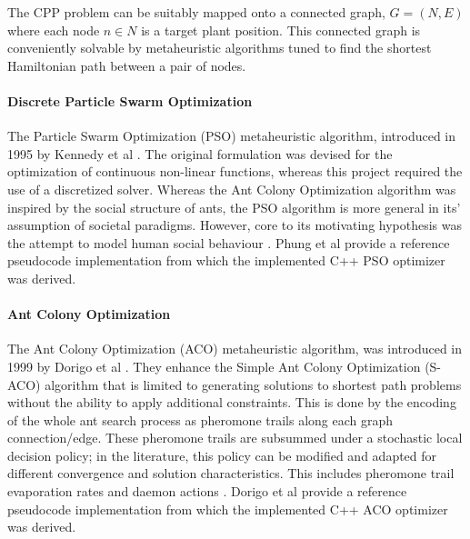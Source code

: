 \documentclass{report}
\begin{document}
The CPP problem can be suitably mapped onto a connected graph, \textit{$G = (N, E)$} where each node \textit{$n \in N$} is a target plant position. This connected graph is conveniently solvable by metaheuristic algorithms tuned to find the shortest Hamiltonian path between a pair of nodes.

\paragraph{Discrete Particle Swarm Optimization}
The Particle Swarm Optimization (PSO) metaheuristic algorithm, introduced in 1995 by Kennedy et al \cite{Kennedy1995}. The original formulation was devised for the optimization of continuous non-linear functions, whereas this project required the use of a discretized solver. Whereas the Ant Colony Optimization algorithm was inspired by the social structure of ants, the PSO algorithm is more general in its' assumption of societal paradigms. However, core to its motivating hypothesis was the attempt to model human social behaviour \cite{Kennedy1995}. Phung et al \cite{Phung2017} provide a reference pseudocode implementation from which the implemented C++ PSO optimizer was derived.

\paragraph{Ant Colony Optimization}
The Ant Colony Optimization (ACO) metaheuristic algorithm, was introduced in 1999 by Dorigo et al \cite{Dorigo1999}. They enhance the Simple Ant Colony Optimization (S-ACO) algorithm that is limited to generating solutions to shortest path problems without the ability to apply additional constraints. This is done by the encoding of the whole ant search process as pheromone trails along each graph connection/edge. These pheromone trails are subsummed under a stochastic local decision policy; in the literature, this policy can be modified and adapted for different convergence and solution characteristics. This includes pheromone trail evaporation rates and daemon actions \cite{Dorigo1999}. Dorigo et al \cite{Dorigo1999} provide a reference pseudocode implementation from which the implemented C++ ACO optimizer was derived.
\end{document}
